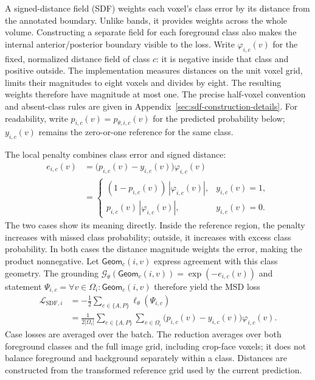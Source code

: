 \documentclass[12pt,a4paper]{article}
\begin{document}
A signed-distance field (SDF) weights each voxel's class error by its
distance from the annotated boundary. Unlike bands, it provides weights
across the whole volume. Constructing a separate field for each foreground
class also makes the internal anterior/posterior boundary visible to the
loss. Write $\varphi_{i,c}(v)$ for the fixed, normalized distance field of
class $c$: it is negative inside that class and positive outside.
The implementation measures distances on the unit voxel grid, limits
their magnitudes to eight voxels and divides by eight. The resulting
weights therefore have magnitude at most one. The precise half-voxel
convention and absent-class rules are given in
Appendix~\ref{sec:sdf-construction-details}. For readability, write
$p_{i,c}(v)=p_{\theta,i,c}(v)$ for the predicted probability below;
$y_{i,c}(v)$ remains the zero-or-one reference for the same class.

The local penalty combines class error and signed distance:
\begin{equation}
\begin{aligned}
e_{i,c}(v)
&=\bigl(p_{i,c}(v)-y_{i,c}(v)\bigr)\varphi_{i,c}(v)\\
&=\begin{cases}
   (1-p_{i,c}(v))\,|\varphi_{i,c}(v)|, &y_{i,c}(v)=1,\\
   p_{i,c}(v)\,|\varphi_{i,c}(v)|, &y_{i,c}(v)=0.
  \end{cases}
\end{aligned}
\label{eq:sdf-local-violation}
\end{equation}
The two cases show its meaning directly. Inside the reference region,
the penalty increases with missed class probability; outside, it
increases with excess class probability. In both cases the distance
magnitude weights the error, making the product nonnegative.
Let $\mathsf{Geom}_c(i,v)$ express agreement with this class geometry.
The grounding
$\mathcal G_\theta(\mathsf{Geom}_c(i,v))=\exp(-e_{i,c}(v))$
and statement
$\Psi_{i,c}=\forall v\in\Omega_i:\mathsf{Geom}_c(i,v)$
therefore yield the MSD loss
\begin{equation}
\begin{aligned}
\mathcal{L}_{\mathrm{SDF},i}
&=-\frac12\sum_{c\in\{A,P\}}\ell_\theta(\Psi_{i,c})\\
&=\frac{1}{2|\Omega_i|}
  \sum_{c\in\{A,P\}}\sum_{v\in\Omega_i}
  \bigl(p_{i,c}(v)-y_{i,c}(v)\bigr)\varphi_{i,c}(v).
\end{aligned}
\label{eq:sdf-full-volume-loss}
\end{equation}
Case losses are averaged over the batch. The reduction averages over both
foreground classes and the full image grid, including crop-face voxels;
it does not balance foreground and background separately within a class.
Distances are constructed from the transformed reference grid
used by the current prediction.
\end{document}
